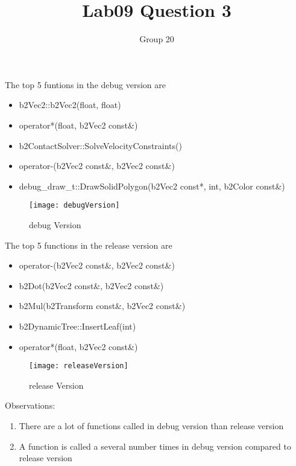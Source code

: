 \documentclass[a4paper,11pt]{article}
\begin{document}
\title{Lab09 Question 3}
\author{Group 20}
\maketitle

The top 5 funtions in the debug version are
\begin{itemize} 
\item b2Vec2::b2Vec2(float, float)
\item operator*(float, b2Vec2 const\&)
\item b2ContactSolver::SolveVelocityConstraints()
\item operator-(b2Vec2 const\&, b2Vec2 const\&)
\item debug\_draw\_t::DrawSolidPolygon(b2Vec2 const*, int, b2Color const\&)
\end{itemize}
\begin{figure}[h]
\centering\texttt{[image: debugVersion]}
\caption{debug Version}
\end{figure}
The top 5 functions in the release version are
\begin{itemize}
\item operator-(b2Vec2 const\&, b2Vec2 const\&)
\item b2Dot(b2Vec2 const\&, b2Vec2 const\&)
\item b2Mul(b2Transform const\&, b2Vec2 const\&)
\item b2DynamicTree::InsertLeaf(int)
\item operator*(float, b2Vec2 const\&)
\end{itemize}
\begin{figure}[h]
\centering\texttt{[image: releaseVersion]}
\caption{release Version}
\end{figure}
Observations: \\
\begin{enumerate}
\item There are a lot of functions called in debug version than release version
\item A function is called a several number times in debug version compared to release version
\end{enumerate}
\end{document}
